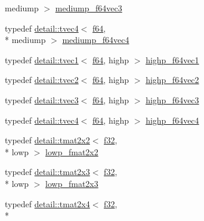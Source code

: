 \begin{DoxyCompactItemize}
mediump $>$ \hyperlink{group__gtc__type__precision_gae2832f9acbf0cc1071fcf93336db6e0c}{mediump\-\_\-f64vec3}
\item 
typedef \hyperlink{structglm_1_1detail_1_1tvec4}{detail\-::tvec4}$<$ \hyperlink{group__gtc__type__precision_ga2bba392e555124b36cde6abba349bab3}{f64}, \\*
mediump $>$ \hyperlink{group__gtc__type__precision_ga0e011facac062fd7fb9b40c7d8288310}{mediump\-\_\-f64vec4}
\item 
typedef \hyperlink{structglm_1_1detail_1_1tvec1}{detail\-::tvec1}$<$ \hyperlink{group__gtc__type__precision_ga2bba392e555124b36cde6abba349bab3}{f64}, highp $>$ \hyperlink{group__gtc__type__precision_ga1054b4e4da2b907b35e1806bd6fbaef1}{highp\-\_\-f64vec1}
\item 
typedef \hyperlink{structglm_1_1detail_1_1tvec2}{detail\-::tvec2}$<$ \hyperlink{group__gtc__type__precision_ga2bba392e555124b36cde6abba349bab3}{f64}, highp $>$ \hyperlink{group__gtc__type__precision_ga1efd4982eaeafae59ce40deb89e018e7}{highp\-\_\-f64vec2}
\item 
typedef \hyperlink{structglm_1_1detail_1_1tvec3}{detail\-::tvec3}$<$ \hyperlink{group__gtc__type__precision_ga2bba392e555124b36cde6abba349bab3}{f64}, highp $>$ \hyperlink{group__gtc__type__precision_ga93cbac95bb9106fe15c987c0f56ae679}{highp\-\_\-f64vec3}
\item 
typedef \hyperlink{structglm_1_1detail_1_1tvec4}{detail\-::tvec4}$<$ \hyperlink{group__gtc__type__precision_ga2bba392e555124b36cde6abba349bab3}{f64}, highp $>$ \hyperlink{group__gtc__type__precision_ga1e9d8145fb9521701a5eeb6df5754184}{highp\-\_\-f64vec4}
\item 
typedef \hyperlink{structglm_1_1detail_1_1tmat2x2}{detail\-::tmat2x2}$<$ \hyperlink{group__gtc__type__precision_ga0ec999b57f5330d9021256e96038df04}{f32}, \\*
lowp $>$ \hyperlink{group__gtc__type__precision_ga99367a30c64035d7e7f76410105d10e3}{lowp\-\_\-fmat2x2}
\item 
typedef \hyperlink{structglm_1_1detail_1_1tmat2x3}{detail\-::tmat2x3}$<$ \hyperlink{group__gtc__type__precision_ga0ec999b57f5330d9021256e96038df04}{f32}, \\*
lowp $>$ \hyperlink{group__gtc__type__precision_ga01c5c29a6cee22c3e75de25c98dbecc9}{lowp\-\_\-fmat2x3}
\item 
typedef \hyperlink{structglm_1_1detail_1_1tmat2x4}{detail\-::tmat2x4}$<$ \hyperlink{group__gtc__type__precision_ga0ec999b57f5330d9021256e96038df04}{f32}, \\*

\end{DoxyCompactItemize}
